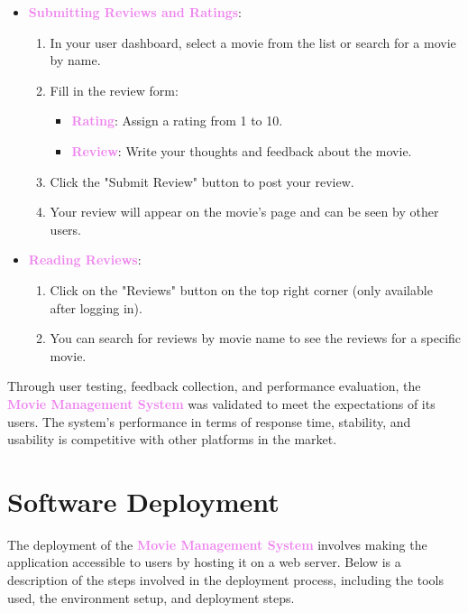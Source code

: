 \documentclass[a4paper,12pt]{article}  %
\renewcommand{\textbf}[1]{\textcolor{violet}{\bfseries #1}}
\begin{document}
\begin{itemize}
    \item \textbf{Submitting Reviews and Ratings}:
    \begin{enumerate}
        \item In your user dashboard, select a movie from the list or search for a movie by name.
        \item Fill in the review form:
        \begin{itemize}
            \item \textbf{Rating}: Assign a rating from 1 to 10.
            \item \textbf{Review}: Write your thoughts and feedback about the movie.
        \end{itemize}
        \item Click the "Submit Review" button to post your review.
        \item Your review will appear on the movie's page and can be seen by other users.
    \end{enumerate}

    \item \textbf{Reading Reviews}:
    \begin{enumerate}
        \item Click on the "Reviews" button on the top right corner (only available after logging in).
        \item You can search for reviews by movie name to see the reviews for a specific movie.
    \end{enumerate}
\end{itemize}

Through user testing, feedback collection, and performance evaluation, the \textbf{Movie Management System} was validated to meet the expectations of its users. The system's performance in terms of response time, stability, and usability is competitive with other platforms in the market.


\clearpage



\section{Software Deployment} \label{sec:sd}

The deployment of the \textbf{Movie Management System} involves making the application accessible to users by hosting it on a web server. Below is a description of the steps involved in the deployment process, including the tools used, the environment setup, and deployment steps.
\end{document}
